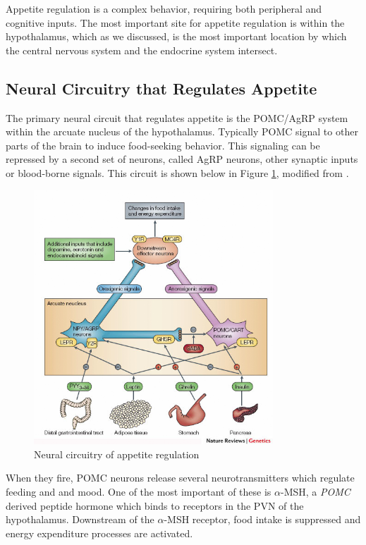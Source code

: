 \documentclass{tufte-handout}
\begin{document}
Appetite regulation is a complex behavior, requiring both peripheral and cognitive inputs.  The most important site for appetite regulation is within the hypothalamus, which as we discussed, is the most important location by which the central nervous system and the endocrine system intersect.  

\subsection{Neural Circuitry that Regulates Appetite}

The primary neural circuit that regulates appetite is the POMC/AgRP system within the arcuate nucleus of the hypothalamus.  Typically POMC signal to other parts of the brain to induce food-seeking behavior.  This signaling can be repressed by a second set of neurons, called AgRP neurons, other synaptic inputs or blood-borne signals.  This circuit is shown below in Figure \ref{fig:agrp-pomc}, modified from \cite{Bell2005}.

\begin{figure}
\centering
  \includegraphics[width=0.8\textwidth]{figures/agrp-pomc}
  \caption{Neural circuitry of appetite regulation}
    \label{fig:agrp-pomc}
\end{figure}

When they fire, POMC neurons release several neurotransmitters which regulate feeding and and mood.  One of the most important of these is $\alpha$-MSH, a \textit{POMC} derived peptide hormone which binds to receptors in the PVN of the hypothalamus.  Downstream of the $\alpha$-MSH receptor, food intake is suppressed and energy expenditure processes are activated.
\end{document}
